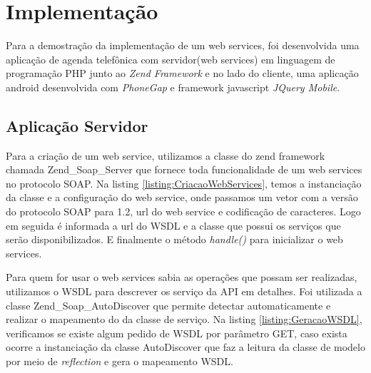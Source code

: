 \documentclass{acm_proc_article-sp}
\begin{document}
		
\section{Implementação}


	
	Para a demostração da implementação de um web services, foi desenvolvida uma aplicação de agenda telefônica com servidor(web services) em linguagem de programação PHP junto ao \emph{Zend Framework} e no lado do cliente, uma aplicação android desenvolvida com \emph{PhoneGap} e framework javascript \emph{JQuery Mobile}.
	
	\subsection{Aplicação Servidor}

	Para a criação de um web service, utilizamos a classe do zend framework chamada Zend\_Soap\_Server que fornece toda funcionalidade de um web services no protocolo SOAP. Na listing \ref{listing:CriacaoWebServices}, temos a instanciação da classe e a configuração do web service, onde passamos um vetor com a versão do protocolo SOAP para 1.2, url do web service e codificação de caracteres. Logo em seguida é informada a url do WSDL e a classe que possui os serviços que serão disponibilizados. E finalmente o método \emph{handle()} para inicializar o web services.
	
	
	
	Para quem for usar o web services sabia as operações que possam ser realizadas, utilizamos o WSDL para descrever os serviço da API em detalhes. Foi utilizada a classe Zend\_Soap\_AutoDiscover que permite detectar automaticamente e realizar o mapeamento do da classe de serviço. Na listing \ref{listing:GeracaoWSDL}, verificamos se existe algum pedido de WSDL por parâmetro GET, caso exista ocorre a instanciação da classe AutoDiscover que faz a leitura da classe de modelo por meio de \emph{reflection} e gera o mapeamento WSDL.
	
\end{document}
